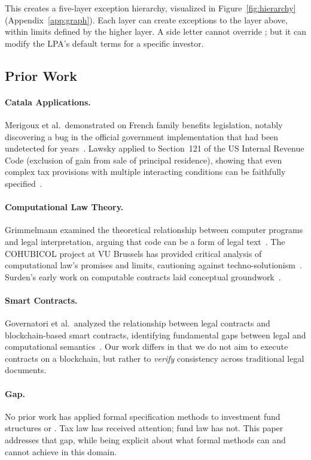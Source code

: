 This creates a five-layer exception hierarchy, visualized in Figure~\ref{fig:hierarchy} (Appendix~\ref{app:graph}). Each layer can create exceptions to the layer above, within limits defined by the higher layer. A side letter cannot override \aifmd{}; but it can modify the LPA's default terms for a specific investor.

\subsection{Prior Work}
\label{sec:prior-work}

\paragraph{Catala Applications.} Merigoux et al.\ demonstrated \catala{} on French family benefits legislation, notably discovering a bug in the official government implementation that had been undetected for years~\cite{merigoux2021catala}. Lawsky applied \catala{} to Section~121 of the US Internal Revenue Code (exclusion of gain from sale of principal residence), showing that even complex tax provisions with multiple interacting conditions can be faithfully specified~\cite{lawsky2022coding}.

\paragraph{Computational Law Theory.} Grimmelmann examined the theoretical relationship between computer programs and legal interpretation, arguing that code can be a form of legal text~\cite{grimmelmann2023structure}. The COHUBICOL project at VU Brussels has provided critical analysis of computational law's promises and limits, cautioning against techno-solutionism~\cite{cohubicol2024}. Surden's early work on computable contracts laid conceptual groundwork~\cite{surden2012computable}.

\paragraph{Smart Contracts.} Governatori et al.\ analyzed the relationship between legal contracts and blockchain-based smart contracts, identifying fundamental gaps between legal and computational semantics~\cite{governatori2018legal}. Our work differs in that we do not aim to execute contracts on a blockchain, but rather to \textit{verify} consistency across traditional legal documents.

\paragraph{Gap.} No prior work has applied formal specification methods to investment fund structures or \aifmd{}. Tax law has received attention; fund law has not. This paper addresses that gap, while being explicit about what formal methods can and cannot achieve in this domain.
